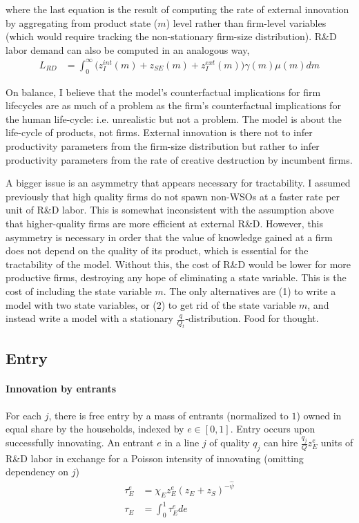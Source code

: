 \documentclass[12pt,english]{article}
\theoremstyle{remark}
\begin{document}
where the last equation is the result of computing the rate of external innovation by aggregating from product state ($m$) level rather than firm-level variables (which would require tracking the non-stationary firm-size distribution). R\&D labor demand can also be computed in an analogous way,
\begin{align*}
	L_{RD} &= \int_0^{\infty} \Big( z_I^{int}(m) + z_{SE}(m) + z_I^{ext}(m) \Big) \gamma(m) \mu(m) dm
\end{align*}

On balance, I believe that the model's counterfactual implications for firm lifecycles are as much of a problem as the firm's counterfactual implications for the human life-cycle: i.e. unrealistic but not a problem. The model is about the life-cycle of products, not firms. External innovation is there not to infer productivity parameters from the firm-size distribution but rather to infer productivity parameters from the rate of creative destruction by incumbent firms. 

A bigger issue is an asymmetry that appears necessary for tractability. I assumed previously that high quality firms do not spawn non-WSOs at a faster rate per unit of R\&D labor. This is somewhat inconsistent with the assumption above that higher-quality firms are more efficient at external R\&D. However, this asymmetry is necessary in order that the value of knowledge gained at a firm does not depend on the quality of its product, which is essential for the tractability of the model. Without this, the cost of R\&D would be lower for more productive firms, destroying any hope of eliminating a state variable. This is the cost of including the state variable $m$. The only alternatives are (1) to write a model with two state variables, or (2) to get rid of the state variable $m$, and instead write a model with a stationary $\frac{q}{Q_t}$-distribution. Food for thought.


\subsection{Entry} 

\paragraph{Innovation by entrants} For each $j$, there is free entry by a mass of entrants (normalized to $1$) owned in equal share by the households, indexed by $e \in [0,1]$. Entry occurs upon successfully innovating. An entrant $e$ in a line $j$ of quality $q_j$ can hire $\frac{q_j}{Q} z_E^e$ units of R\&D labor in exchange for a Poisson intensity of innovating (omitting dependency on $j$)
\begin{align}
\tau_E^e &= \chi_E z_E^e (z_E + z_S)^{-\hat{\psi}} \label{simplified_entrant_innovation_rate} \\
\tau_E &= \int_0^1 \tau_E^e de \nonumber
\end{align}
\end{document}
